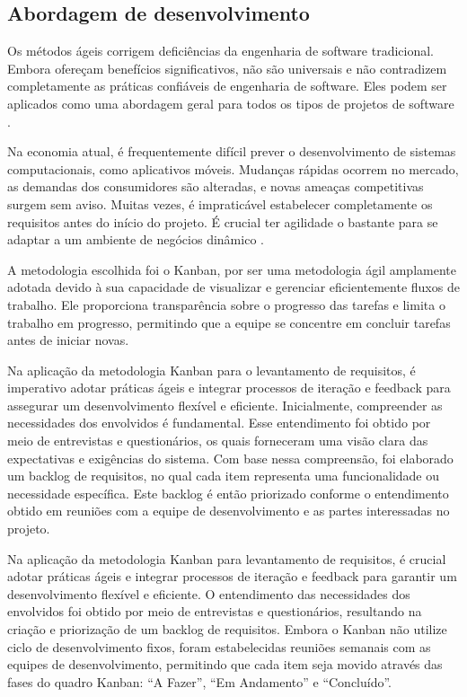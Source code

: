 
\subsection{Abordagem de desenvolvimento}

Os métodos ágeis corrigem deficiências da engenharia de software tradicional.
Embora ofereçam benefícios significativos, não são universais e não contradizem completamente as práticas confiáveis de engenharia de software. Eles podem ser aplicados como uma abordagem geral para todos os tipos de projetos de software \cite{pressman}.

Na economia atual, é frequentemente difícil prever o desenvolvimento de sistemas computacionais, como aplicativos móveis. Mudanças rápidas ocorrem no mercado, as demandas dos consumidores são alteradas, e novas ameaças competitivas surgem sem aviso. Muitas vezes, é impraticável estabelecer completamente os requisitos antes do início do projeto. É crucial ter agilidade o bastante para se adaptar a um ambiente de negócios dinâmico \cite{pressman}.

A metodologia escolhida foi o Kanban, por ser uma metodologia ágil amplamente adotada devido à sua capacidade de visualizar e gerenciar eficientemente fluxos de trabalho. Ele proporciona transparência sobre o progresso das tarefas e limita o trabalho em progresso, permitindo que a equipe se concentre em concluir tarefas antes de iniciar novas.

Na aplicação da metodologia Kanban para o levantamento de requisitos, é imperativo adotar práticas ágeis e integrar processos de iteração e feedback para assegurar um desenvolvimento flexível e eficiente. Inicialmente, compreender as necessidades dos envolvidos é fundamental. Esse entendimento foi obtido por meio de entrevistas e questionários, os quais forneceram uma visão clara das expectativas e exigências do sistema. Com base nessa compreensão, foi elaborado um backlog de requisitos, no qual cada item representa uma funcionalidade ou necessidade específica. Este backlog é então priorizado conforme o entendimento obtido em reuniões com a equipe de desenvolvimento e as partes interessadas no projeto.

Na aplicação da metodologia Kanban para levantamento de requisitos, é crucial adotar práticas ágeis e integrar processos de iteração e feedback para garantir um desenvolvimento flexível e eficiente. O entendimento das necessidades dos envolvidos foi obtido por meio de entrevistas e questionários, resultando na criação e priorização de um backlog de requisitos. Embora o Kanban não utilize ciclo de desenvolvimento fixos, foram estabelecidas reuniões semanais com as equipes de desenvolvimento, permitindo que cada item seja movido através das fases do quadro Kanban: “A Fazer”, “Em Andamento” e “Concluído”.

